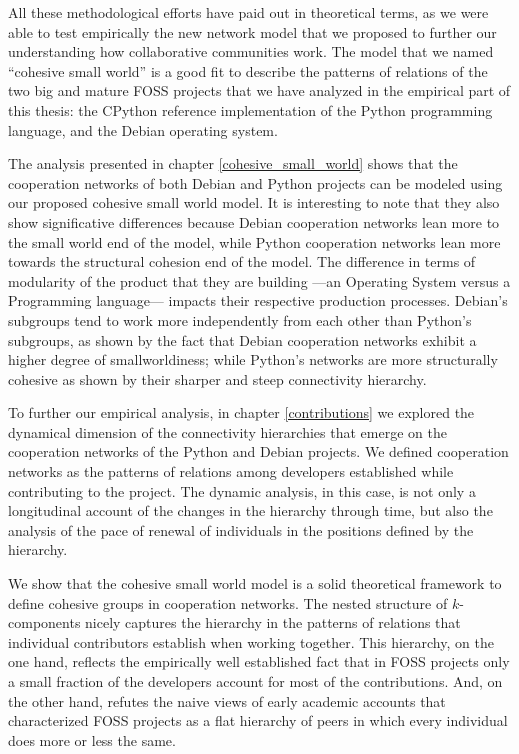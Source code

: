 All these methodological efforts have paid out in theoretical terms, as we were able to test empirically the new network model that we proposed to further our understanding how collaborative communities work. The model that we named ``cohesive small world'' is a good fit to describe the patterns of relations of the two big and mature FOSS projects that we have analyzed in the empirical part of this thesis: the CPython reference implementation of the Python programming language, and the Debian operating system.

The analysis presented in chapter \ref{cohesive_small_world} shows that the cooperation networks of both Debian and Python projects can be modeled using our proposed cohesive small world model. It is interesting to note that they also show significative differences because Debian cooperation networks lean more to the small world end of the model, while Python cooperation networks lean more towards the structural cohesion end of the model. The difference in terms of modularity of the product that they are building ---an Operating System versus a Programming language--- impacts their respective production processes. Debian's subgroups tend to work more independently from each other than Python's subgroups, as shown by the fact that Debian cooperation networks exhibit a higher degree of smallworldiness; while Python's networks are more structurally cohesive as shown by their sharper and steep connectivity hierarchy.

To further our empirical analysis, in chapter \ref{contributions} we explored the dynamical dimension of the connectivity hierarchies that emerge on the cooperation networks of the Python and Debian projects. We defined cooperation networks as the patterns of relations among developers established while contributing to the project. The dynamic analysis, in this case, is not only a longitudinal account of the changes in the hierarchy through time, but also the analysis of the pace of renewal of individuals in the positions defined by the hierarchy.

We show that the cohesive small world model is a solid theoretical framework to define cohesive groups in cooperation networks. The nested structure of $k$-components nicely captures the hierarchy in the patterns of relations that individual contributors establish when working together. This hierarchy, on the one hand, reflects the empirically well established fact that in FOSS projects only a small fraction of the developers account for most of the contributions. And, on the other hand, refutes the naive views of early academic accounts that characterized FOSS projects as a flat hierarchy of peers in which every individual does more or less the same. 

